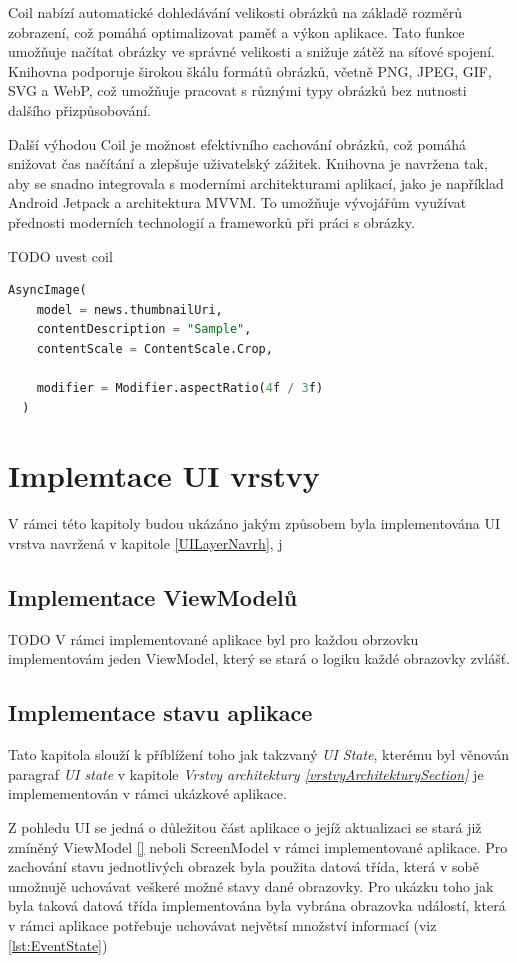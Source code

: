 Coil nabízí automatické dohledávání velikosti obrázků na základě rozměrů zobrazení, což pomáhá optimalizovat paměť a výkon aplikace. Tato funkce 
umožňuje načítat obrázky ve správné velikosti a snižuje zátěž na síťové spojení. Knihovna podporuje širokou škálu formátů obrázků, včetně PNG, 
JPEG, GIF, SVG a WebP, což umožňuje pracovat s různými typy obrázků bez nutnosti dalšího přizpůsobování.

Další výhodou Coil je možnost efektivního cachování obrázků, což pomáhá snižovat čas načítání a zlepšuje uživatelský zážitek. Knihovna je navržena tak, 
aby se snadno integrovala s moderními architekturami aplikací, jako je například Android Jetpack a architektura MVVM. To umožňuje vývojářům využívat 
přednosti moderních technologií a frameworků při práci s obrázky.

TODO uvest coil
\begin{lstlisting}[caption={Coil}, label={lst:Coil3}, language=SQL]
  AsyncImage(
    model = news.thumbnailUri,
    contentDescription = "Sample",
    contentScale = ContentScale.Crop,

    modifier = Modifier.aspectRatio(4f / 3f)
  )
\end{lstlisting}

\section{Implemtace UI vrstvy} \label{UILayerImpl}
V rámci této kapitoly budou ukázáno jakým způsobem byla implementována UI vrstva navržená v kapitole \ref{UILayerNavrh}, j

\subsection{Implementace ViewModelů} \label{ViewModelImpl}
TODO %
V rámci implementované aplikace byl pro každou obrzovku implementovám jeden ViewModel, který se stará o logiku každé obrazovky zvlášť.


\subsection{Implementace stavu aplikace} \label{stateHandlingImpl}
Tato kapitola slouží k příblížení toho jak takzvaný \textit{UI State}, kterému byl věnován paragraf \textit{UI state} v 
kapitole \textit{Vrstvy architektury \ref{vrstvyArchitekturySection} } je implemementován v rámci ukázkové aplikace.

Z pohledu UI se jedná o důležitou část aplikace o jejíž aktualizaci se stará již zmíněný ViewModel \ref{} neboli ScreenModel v rámci
implementované aplikace. 
Pro zachování stavu jednotlivých obrazek byla použita datová třída, která v sobě umožnujě uchovávat veškeré možné stavy dané obrazovky.
Pro ukázku toho jak byla taková datová třída implementována byla vybrána obrazovka událostí, která v rámci aplikace potřebuje 
uchovávat největsí množství informací (viz \ref{lst:EventState})

